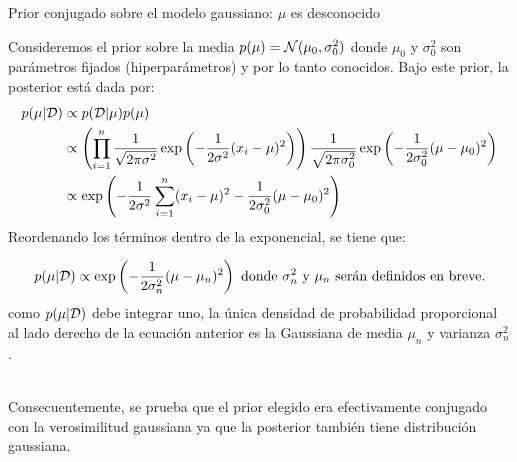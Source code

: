 \documentclass[9pt]{beamer}
\begin{document}
\begin{frame}{Prior conjugado sobre el modelo gaussiano: $\mu$ es desconocido}

Consideremos el prior sobre la media $p(\mu) = {\mathcal N}(\mu_0,\sigma_0^2)$ donde $\mu_0$ y $\sigma^2_0$ son parámetros fijados (hiperparámetros) y por lo tanto conocidos. Bajo este prior, la posterior está dada por:
 \begin{align*}
 	p(\mu|{\mathcal D})& \propto p({\mathcal D}|\mu)p(\mu)\\
 	& \propto \left(\prod_{i=1}^n \frac{1}{\sqrt{2\pi\sigma^2}}\exp\left(-\frac{1}{2\sigma^2}(x_i-\mu)^2\right) \right)\frac{1}{\sqrt{2\pi\sigma_0^2}}\exp\left(-\frac{1}{2\sigma_0^2}(\mu-\mu_0)^2\right)\\
 	&\propto \exp\left(-\frac{1}{2\sigma^2}\sum_{i=1}^n(x_i-\mu)^2-\frac{1}{2\sigma_0^2}(\mu-\mu_0)^2\right)
 \end{align*} 
 \pause
 Reordenando los términos dentro de la exponencial, se tiene que:
 
 \begin{equation*}
 	p(\mu|{\mathcal D}) \propto \exp\left(-\frac{1}{2\sigma_n^2}(\mu - \mu_n)^2\right) \text{ donde $\sigma_n^2$ y $\mu_n$ serán definidos en breve.}
 	\end{equation*} 
\pause
como $p(\mu|{\mathcal D})$ debe integrar uno, la única densidad de probabilidad proporcional al lado derecho de la ecuación anterior es la Gaussiana de media $\mu_n$ y varianza $\sigma_n^2$.\\~\ \pause

Consecuentemente, se prueba que el prior elegido era efectivamente conjugado con la verosimilitud gaussiana ya que la posterior también tiene distribución gaussiana.

\end{frame}
\end{document}
